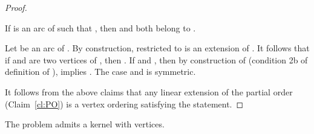 \begin{proof}
\begin{claim} 
If  is an arc of  such that , then  and  both belong to .
\end{claim}
\begin{proofclaim}
Let  be an arc of . By construction,  restricted to  is an extension of . 
It follows that if  and  are two vertices of , then . If  and , then by construction of  (condition 2b of definition of ),  implies . The case  and  is symmetric.
\end{proofclaim}

It follows from the above claims that any linear extension of the partial order  (Claim~\ref{cl:PO}) is a vertex ordering satisfying the statement.
\end{proof} 	



\begin{theorem} \label{thm:kernelfasbt}
The \FASBT{} problem admits a kernel with  vertices. 
\end{theorem}

